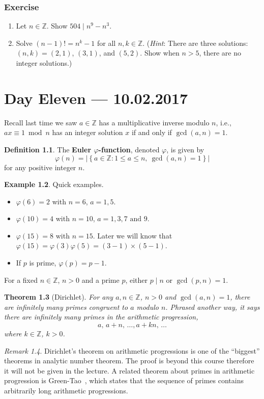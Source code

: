 \documentclass{amsbook}
\theoremstyle{plain}
\newtheorem{theorem}{Theorem}[chapter] %
\theoremstyle{definition}
\newtheorem{definition}[theorem]{Definition}
\newtheorem{example}[theorem]{Example}
\theoremstyle{remark}
\newtheorem{remark}[theorem]{Remark}
\numberwithin{equation}{chapter}
\numberwithin{figure}{chapter}
\newcommand{\Z}{\mathbb{Z}}
\begin{document}
\subsection*{Exercise}
\begin{enumerate}
\item Let $n \in \Z$. Show $504 \mid n^9 - n^3$.
\item Solve $(n - 1)! = n^k - 1$ for all $n, k \in \Z$. (\emph{Hint}: There are three solutions: $(n, k) = (2,1)$, $(3,1)$, and $(5,2)$. Show when $n > 5$, there are no integer solutions.)
\end{enumerate}
\chapter[Lecture Eleven]{Day Eleven \hfill {\footnotesize \rm --- 10.02.2017}}

Recall last time we saw $a \in \Z$ has a multiplicative inverse modulo $n$, i.e., $ax \equiv 1 \bmod n$ has an integer solution $x$ if and only if $\gcd (a, n) = 1$.
\begin{definition}
  The \textbf{Euler $\varphi$-function}, denoted $\varphi$, is given by
  \[
    \varphi(n) = | \left\{ a \in \Z : 1 \leqslant a \leqslant n, ~\gcd(a, n) = 1\right\} | 
  \]
for any positive integer $n$.
\end{definition}
\begin{example}\label{ex:ex1_day11}
  Quick examples.
  \begin{itemize}
  \item $\varphi(6) = 2$ with $n = 6$, $a = 1, 5$.
  \item $\varphi(10) = 4$ with $n = 10$, $a = 1, 3, 7 \text{ and } 9$.
  \item $\varphi(15) = 8$ with $n = 15$. Later we will know that $\varphi(15) = \varphi(3)\varphi(5) = (3-1) \times (5-1)$.
  \item If $p$ is prime, $\varphi(p) = p - 1$.
  \end{itemize}
\end{example}
For a fixed $n \in \Z$, $n > 0$ and a prime $p$, either $p \mid n$ or $\gcd (p, n) = 1$. 
\begin{theorem}[Dirichlet]
  For any $a, n \in \Z$, $n > 0$ and $\gcd (a, n) = 1$, there are infinitely many primes congruent to $a$ modulo $n$. Phrased another way, it says there are infinitely many primes in the arithmetic progression,
  \[
    a, \, a + n, \, \ldots , a + kn, \, \ldots 
  \]
  where $k \in \Z$, $k > 0$.
\end{theorem}
\begin{remark}
  Dirichlet's theorem on arithmetic progressions is one of the ``biggest'' theorems in analytic number theorem. The proof is beyond this course therefore it will not be given in the lecture. A related theorem about primes in arithmetic progression is Green-Tao~\cite{Green2004}, which states that the sequence of primes contains arbitrarily long arithmetic progressions.
\end{remark}
\end{document}
